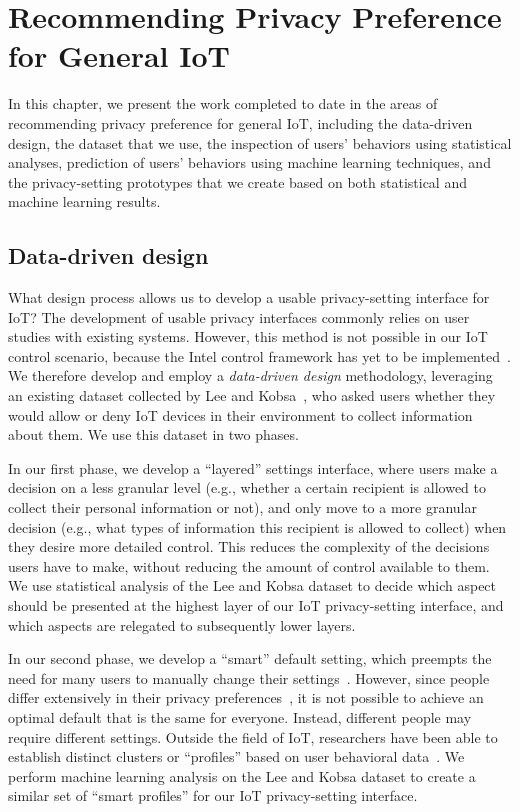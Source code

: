 \chapter{Recommending Privacy Preference for General IoT}
In this chapter, we present the work completed to date in the areas of recommending privacy preference for general IoT, including the data-driven design, the dataset that we use, the inspection of users' behaviors using statistical analyses, prediction of users' behaviors using machine learning techniques, and the privacy-setting prototypes that we create based on both statistical and machine learning results.

\section{Data-driven design}
What design process allows us to develop a usable privacy-setting interface for IoT? The development of usable privacy interfaces commonly relies on user studies with existing systems. However, this method is not possible in our IoT control scenario, because the Intel control framework has yet to be implemented~\cite{chow2015hci}. We therefore develop and employ a \emph{data-driven design} methodology, leveraging an existing dataset collected by Lee and Kobsa~\cite{lee2016understanding}, who asked users whether they would allow or deny IoT devices in their environment to collect information about them. We use this dataset in two phases. 

In our first phase, we develop a ``layered'' settings interface, where users make a decision on a less granular level (e.g., whether a certain recipient is allowed to collect their personal information or not), and only move to a more granular decision (e.g., what types of information this recipient is allowed to collect) when they desire more detailed control. This reduces the complexity of the decisions users have to make, without reducing the amount of control available to them. We use statistical analysis of the Lee and Kobsa dataset to decide which aspect should be presented at the highest layer of our IoT privacy-setting interface, and which aspects are relegated to subsequently lower layers.

In our second phase, we develop a ``smart'' default setting, which preempts the need for many users to manually change their settings~\cite{smith2013choice}. However, since people differ extensively in their privacy preferences~\cite{olson2005study}, it is not possible to achieve an optimal default that is the same for everyone. Instead, different people may require different settings. Outside the field of IoT, researchers have been able to establish distinct clusters or ``profiles'' based on user behavioral data~\cite{knijnenburg2013dimensionality, olson2005study, wisniewski2017making}. We perform machine learning analysis on the Lee and Kobsa dataset to create a similar set of ``smart profiles'' for our IoT privacy-setting interface.

